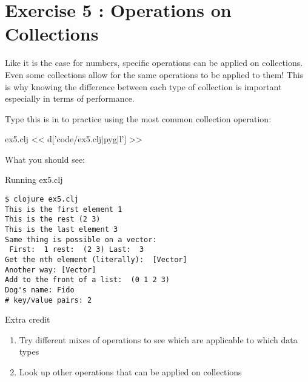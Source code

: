 \chapter{Exercise 5 : Operations on Collections}

Like it is the case for numbers, specific operations can be applied on collections.
Even some collections allow for the same operations to be applied to them! This is why knowing the difference between each type of collection is important especially
in terms of performance.

Type this is in to practice using the most common collection operation:
\begin{code}{ex5.clj}
<< d['code/ex5.clj|pyg|l'] >>
\end{code} 

What you should see:
\begin{code}{Running ex5.clj}
\begin{Verbatim}
$ clojure ex5.clj 
This is the first element 1
This is the rest (2 3)
This is the last element 3
Same thing is possible on a vector: 
 First:  1 rest:  (2 3) Last:  3
Get the nth element (literally):  [Vector]
Another way: [Vector]
Add to the front of a list:  (0 1 2 3)
Dog's name: Fido
# key/value pairs: 2
\end{Verbatim}
\end{code}

Extra credit

\begin{enumerate}
\item{Try different mixes of operations to see which are applicable to which data types}
\item{Look up other operations that can be applied on collections}
\end{enumerate}